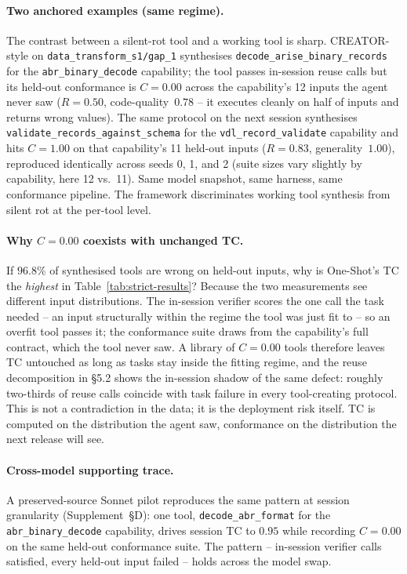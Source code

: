 \documentclass[sigconf,anonymous,natbib=false]{acmart}
\begin{document}
\paragraph{Two anchored examples (same regime).}
The contrast between a silent-rot tool and a working tool is sharp. CREATOR-style on \texttt{data\_transform\_s1/gap\_1} synthesises \texttt{decode\_arise\_binary\_records} for the \texttt{abr\_binary\_decode} capability; the tool passes in-session reuse calls but its held-out conformance is $C{=}0.00$ across the capability's 12 inputs the agent never saw ($R{=}0.50$, code-quality~$0.78$ -- it executes cleanly on half of inputs and returns wrong values). The same protocol on the next session synthesises \texttt{validate\_records\_against\_schema} for the \texttt{vdl\_record\_validate} capability and hits $C{=}1.00$ on that capability's 11 held-out inputs ($R{=}0.83$, generality~$1.00$), reproduced identically across seeds 0, 1, and 2 (suite sizes vary slightly by capability, here 12 vs.\ 11). Same model snapshot, same harness, same conformance pipeline. The framework discriminates working tool synthesis from silent rot at the per-tool level.

\paragraph{Why $C{=}0.00$ coexists with unchanged TC.}
If $96.8\%$ of synthesised tools are wrong on held-out inputs, why is One-Shot's TC the \emph{highest} in Table~\ref{tab:strict-results}? Because the two measurements see different input distributions. The in-session verifier scores the one call the task needed -- an input structurally within the regime the tool was just fit to -- so an overfit tool passes it; the conformance suite draws from the capability's full contract, which the tool never saw. A library of $C{=}0.00$ tools therefore leaves TC untouched as long as tasks stay inside the fitting regime, and the reuse decomposition in \S5.2 shows the in-session shadow of the same defect: roughly two-thirds of reuse calls coincide with task failure in every tool-creating protocol. This is not a contradiction in the data; it is the deployment risk itself. TC is computed on the distribution the agent saw, conformance on the distribution the next release will see.

\paragraph{Cross-model supporting trace.} A preserved-source Sonnet pilot reproduces the same pattern at session granularity (Supplement~\S D): one tool, \texttt{decode\_abr\_format} for the \texttt{abr\_binary\_decode} capability, drives session TC to $0.95$ while recording $C{=}0.00$ on the same held-out conformance suite. The pattern -- in-session verifier calls satisfied, every held-out input failed -- holds across the model swap.
\end{document}
